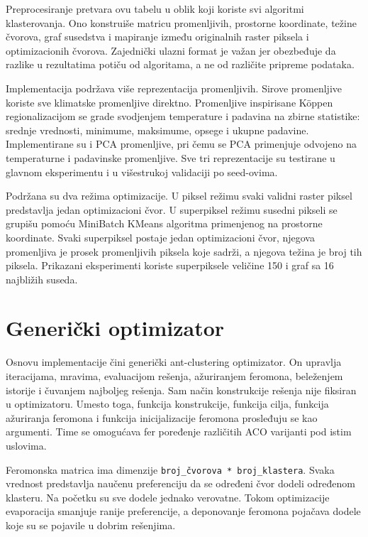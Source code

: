 \documentclass[11pt]{article}
\begin{document}
Preprocesiranje pretvara ovu tabelu u oblik koji koriste svi algoritmi klasterovanja. Ono konstruiše matricu promenljivih, prostorne koordinate, težine čvorova, graf susedstva i mapiranje između originalnih raster piksela i optimizacionih čvorova. Zajednički ulazni format je važan jer obezbeđuje da razlike u rezultatima potiču od algoritama, a ne od različite pripreme podataka.

Implementacija podržava više reprezentacija promenljivih. Sirove promenljive koriste sve klimatske promenljive direktno. Promenljive inspirisane Köppen regionalizacijom se grade svodjenjem temperature i padavina na zbirne statistike: srednje vrednosti, minimume, maksimume, opsege i ukupne padavine. Implementirane su i PCA promenljive, pri čemu se PCA primenjuje odvojeno na temperaturne i padavinske promenljive. Sve tri reprezentacije su testirane u glavnom eksperimentu i u višestrukoj validaciji po seed-ovima.

Podržana su dva režima optimizacije. U piksel režimu svaki validni raster piksel predstavlja jedan optimizacioni čvor. U superpiksel režimu susedni pikseli se grupišu pomoću MiniBatch KMeans algoritma primenjenog na prostorne koordinate. Svaki superpiksel postaje jedan optimizacioni čvor, njegova promenljiva je prosek promenljivih piksela koje sadrži, a njegova težina je broj tih piksela. Prikazani eksperimenti koriste superpiksele veličine 150 i graf sa 16 najbližih suseda.

\section*{Generički optimizator}

Osnovu implementacije čini generički ant-clustering optimizator. On upravlja iteracijama, mravima, evaluacijom rešenja, ažuriranjem feromona, beleženjem istorije i čuvanjem najboljeg rešenja. Sam način konstrukcije rešenja nije fiksiran u optimizatoru. Umesto toga, funkcija konstrukcije, funkcija cilja, funkcija ažuriranja feromona i funkcija inicijalizacije feromona prosleđuju se kao argumenti. Time se omogućava fer poređenje različitih ACO varijanti pod istim uslovima.

Feromonska matrica ima dimenzije \texttt{broj\_čvorova * broj\_klastera}. Svaka vrednost predstavlja naučenu preferenciju da se određeni čvor dodeli određenom klasteru. Na početku su sve dodele jednako verovatne. Tokom optimizacije evaporacija smanjuje ranije preferencije, a deponovanje feromona pojačava dodele koje su se pojavile u dobrim rešenjima.
\end{document}
